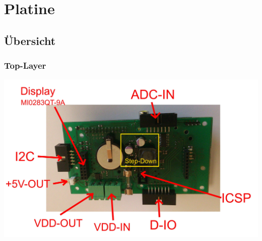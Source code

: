 \documentclass[a4paper,10pt]{article}
\begin{document}


\section{Platine}

\subsection{Übersicht}

\subsubsection{Top-Layer}

\includegraphics[width=\textwidth]{pointhiboard_overview_top}
\end{document}
